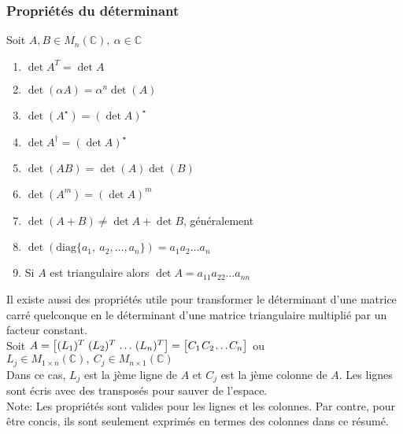 \subsubsection{Propriétés du déterminant}
Soit $A, B \in M_n(\mathbb{C}), \ \alpha \in \mathbb{C}$ \begin{enumerate}
    \item $\det A^T = \det A$
    \item $\det(\alpha A) = \alpha^n \det(A)$
    \item $\det (A^\star) = (\det A)^\star$
    \item $\det A^\dagger = (\det A)^\star$
    \item $\det(AB) = \det(A) \det(B)$
    \item $\det(A^m) = (\det A)^m$
    \item $\det(A + B) \neq \det A + \det B$, généralement
    \item $\det(\text{diag}\{a_1, \ a_2, \ldots, a_n \}) = a_1 a_2 \dots a_n$
    \item Si $A$ est triangulaire alors $\det A = a_{11} a_{22} \dots a_{nn}$
\end{enumerate}
Il existe aussi des propriétés utile pour transformer le déterminant d'une matrice carré quelconque
en le déterminant d'une matrice triangulaire multiplié par un facteur constant. \\
Soit $A = \arraycolsep=0.3\arraycolsep \begin{bmatrix}
        (L_1)^T & (L_2)^T & \ldots & (L_n)^T
    \end{bmatrix} = \arraycolsep=0.3\arraycolsep \begin{bmatrix}
        C_1 & C_2 & \ldots & C_n
    \end{bmatrix}$ ou $L_j \in M_{1 \times n}(\mathbb{C}), \ C_j \in M_{n\times 1}(\mathbb{C})$ \\
Dans ce cas, $L_j$ est la jème ligne de $A$ et $C_j$ est la jème colonne de $A$.
Les lignes sont écris avec des transposés pour sauver de l'espace. \\
Note: Les propriétés sont valides pour les lignes et les colonnes.
Par contre, pour être concis, ils sont seulement exprimés en termes des colonnes dans ce résumé.
